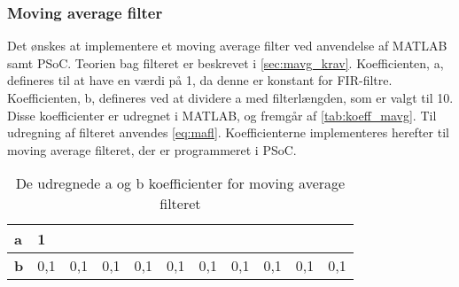 \subsubsection{Moving average filter}
Det ønskes at implementere et moving average filter ved anvendelse af MATLAB samt PSoC. Teorien bag filteret er beskrevet i \autoref{sec:mavg_krav}. Koefficienten, a, defineres til at have en værdi på 1, da denne er konstant for FIR-filtre. Koefficienten, b, defineres ved at dividere a med filterlængden, som er valgt til 10. Disse koefficienter er udregnet i MATLAB, og fremgår af \autoref{tab:koeff_mavg}. Til udregning af filteret anvendes \autoref{eq:mafl}. Koefficienterne implementeres herefter til moving average filteret, der er programmeret i PSoC. 

\begin{table}[H]
\centering
\begin{tabular}{|l|l|l|l|l|l|l|l|l|l|l|}
\hline
\textbf{a} & 1   &     &     &     &     &     &     &     &     &     \\ \hline
\textbf{b} & 0,1 & 0,1 & 0,1 & 0,1 & 0,1 & 0,1 & 0,1 & 0,1 & 0,1 & 0,1 \\ \hline
\end{tabular}
\caption{De udregnede a og b koefficienter for moving average filteret}
\label{tab:koeff_mavg}
\end{table}
